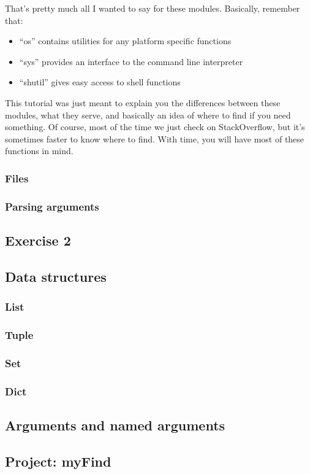 \vspace{5mm}

That's pretty much all I wanted to say for these modules. Basically, remember that:

\begin{itemize}
\item ``os'' contains utilities for any platform specific functions
\item ``sys'' provides an interface to the command line interpreter
\item ``shutil'' gives easy access to shell functions
\end{itemize}

This tutorial was just meant to explain you the differences between these modules,
what they serve, and basically an idea of where to find if you need something.
Of course, most of the time we just check on StackOverflow, but it's sometimes
faster to know where to find. With time, you will have most of these functions in mind.

\subsubsection{Files}
\subsubsection{Parsing arguments}

\subsection{Exercise 2}

\subsection{Data structures}
\subsubsection{List}
\subsubsection{Tuple}
\subsubsection{Set}
\subsubsection{Dict}

\subsection{Arguments and named arguments}

\subsection{Project: myFind}
